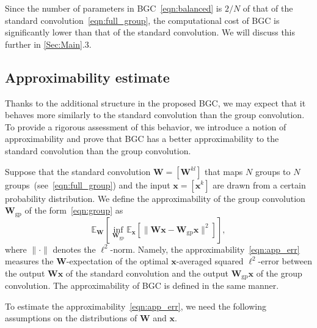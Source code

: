 \documentclass[10pt,a4paper]{amsart}
\numberwithin{equation}{section}
\theoremstyle{remark}
\newcommand\bW{\mathbf{W}}
\newcommand\bx{\mathbf{x}}
\newcommand\bbE{\mathbb{E}}
\newcommand\gp{\mathrm{gp}}
\begin{document}
Since the number of parameters in BGC~\eqref{eqn:balanced} is $2/N$ of that of the standard convolution~\eqref{eqn:full_group}, the computational cost of BGC is significantly lower than that of the standard convolution. We will discuss this further in \cref{Sec:Main}.3.

\subsection{Approximability estimate}
Thanks to the additional structure in the proposed BGC, we may expect that it behaves more similarly to the standard convolution than the group convolution.
To provide a rigorous assessment of this behavior, we introduce a notion of approximability and prove that BGC has a better approximability to the standard convolution than the group convolution.

Suppose that the standard convolution $\bW = [\bW^{kl}]$ that maps $N$ groups to $N$ groups~(see~\eqref{eqn:full_group}) and the input $\bx = [\bx^k]$ are drawn from a certain probability distribution.
We define the approximability of the group convolution $\bW_{\gp}$ of the form~\eqref{eqn:group} as
\begin{equation}
    \label{eqn:app_err}
    \bbE_{\bW} \left[ \inf_{\bW_{\gp}} \bbE_{\bx} \left[ \| \bW \bx - \bW_{\gp} \bx \|^2 \right] \right],
\end{equation}
where $\| \cdot \|$ denotes the $\ell^2$-norm.
Namely, the approximability~\eqref{eqn:app_err} measures the $\bW$-expectation of the optimal $\bx$-averaged squared $\ell^2$-error between the output $\bW \bx$ of the standard convolution and the output $\bW_{\gp} \bx$ of the group convolution.
The approximability of BGC is defined in the same manner.

To estimate the approximability~\eqref{eqn:app_err}, we need the following assumptions on the distributions of $\bW$ and $\bx$.
\end{document}
